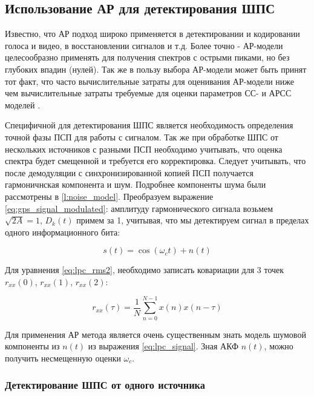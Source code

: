 \subsection{Использование АР для детектирования ШПС}
Известно, что АР подход широко применяется в детектировании и кодировании голоса и видео, в восстановлении сигналов и т.д.
Более точно - АР-модели целесообразно применять для получения спектров с острыми пиками, но без глубоких впадин (нулей).
Так же в пользу выбора АР-модели может быть принят тот факт, что часто вычислительные затраты для оценивания АР-модели 
ниже чем вычислительные затраты требуемые для оценки параметров СС- и АРСС моделей \cite{marpl_book}.

Специфичной для детектирования ШПС является необходимость определения точной фазы ПСП
для работы с сигналом. Так же при обработке ШПС от нескольких источников с разными ПСП необходимо учитывать,
что оценка спектра будет смещенной и требуется его корректировка. Следует учитывать, что после демодуляции
с синхронизированной копией ПСП получается гармоничнская компонента и шум. Подробнее компоненты шума были
рассмотрены в \ref{l:noise_model}. Преобразуем выражение \ref{eq:gps_signal_modulated}: амплитуду гармонического
сигнала возьмем ${\sqrt{2A} = 1}$, ${D_k(t)}$ примем за 1, учитывая, что мы детектируем сигнал в пределах одного
информационного бита:
\begin{center}
\begin{equation}
	\label{eq:lpc_signal}
	s(t) = \cos(\omega_{c}t) + n(t)
\end{equation}
\end{center}

Для уравнения \ref{eq:lpc_rms2}, необходимо записать ковариации для 3 точек
${r_{xx}(0)}$, ${r_{xx}(1)}$, ${r_{xx}(2)}$:

\begin{center}
\begin{equation}
	\label{eq:lpc_cov}
	{r_{xx}(\tau) = \frac{1}{N} \sum \limits_{n=0}^{N-1} x(n) x(n-\tau)}
\end{equation}
\end{center}

Для применения АР метода является очень существенным знать модель шумовой компоненты из ${n(t)}$ из выражения
\ref{eq:lpc_signal}. Зная АКФ ${n(t)}$, можно получить несмещенную оценки ${\omega_c}$.

\subsubsection{Детектирование ШПС от одного источника}

